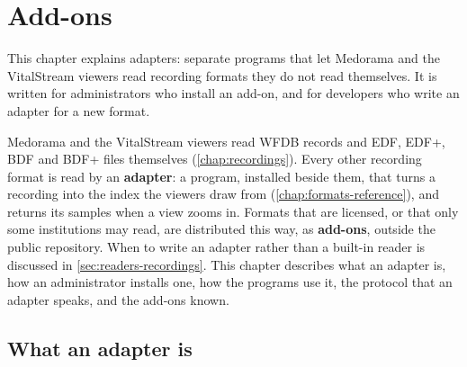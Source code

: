 \chapter{Add-ons}
\label{chap:addons}

This chapter explains adapters: separate programs that let Medorama and the VitalStream viewers
read recording formats they do not read themselves. It is written for administrators who install
an add-on, and for developers who write an adapter for a new format.

Medorama and the VitalStream viewers read WFDB records and EDF, EDF+, BDF and BDF+ files
themselves (\cref{chap:recordings}). Every other recording format is read by an
\textbf{adapter}: a program, installed beside them, that turns a recording into the index the
viewers draw from (\cref{chap:formats-reference}), and returns its samples when a view zooms in.
Formats that are licensed, or that only some institutions may read, are distributed this way, as
\textbf{add-ons}, outside the public repository. When to write an adapter rather than a built-in
reader is discussed in \cref{sec:readers-recordings}. This chapter describes what an adapter is,
how an administrator installs one, how the programs use it, the protocol that an adapter speaks,
and the add-ons known.

\section{What an adapter is}
\label{sec:addons-what}

